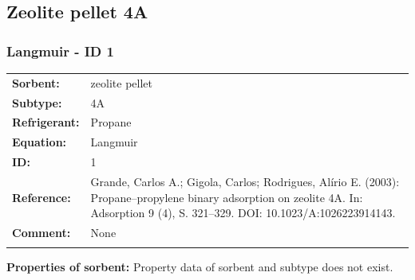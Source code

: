 \subsection{Zeolite pellet 4A}
%
\subsubsection{Langmuir - ID 1}
%
\begin{tabular}[l]{|lp{11.5cm}|}
\hline
\addlinespace

\textbf{Sorbent:} & zeolite pellet \\
\textbf{Subtype:} & 4A \\
\textbf{Refrigerant:} & Propane \\
\textbf{Equation:} & Langmuir \\
\textbf{ID:} & 1 \\
\textbf{Reference:} & Grande, Carlos A.; Gigola, Carlos; Rodrigues, Alírio E. (2003): Propane–propylene binary adsorption on zeolite 4A. In: Adsorption 9 (4), S. 321–329. DOI: 10.1023/A:1026223914143. \\
\textbf{Comment:} & None \\

\addlinespace
\hline
\end{tabular}
\newline

\textbf{Properties of sorbent:}
\newline
%
Property data of sorbent and subtype does not exist.

